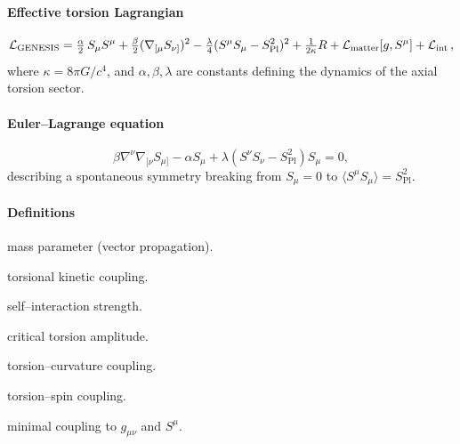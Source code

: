 \documentclass{article}
\newcommand{\Splanck}{S_{\mathrm{Pl}}}
\begin{document}
\paragraph{Effective torsion Lagrangian}
\begin{equation}\label{eq:full-lagrangian}
  \mathcal L_{\rm GENESIS}
    = \tfrac{\alpha}{2}\,S_\mu S^\mu
    + \tfrac{\beta}{2} (\nabla_{[\mu} S_{\nu]})^2
    - \tfrac{\lambda}{4}(S^\mu S_\mu - \Splanck^2)^2
    + \tfrac1{2\kappa}R
    + \mathcal L_{\rm matter}[g,S^\mu]
    + \mathcal L_{\rm int}\,,
\end{equation}
where \(\kappa=8\pi G/c^4\), and \(\alpha, \beta, \lambda\) are constants defining the dynamics of the axial torsion sector.

\paragraph{Euler--Lagrange equation}
\begin{equation}\label{eq:torsion-EOM}
  \beta \nabla^\nu \nabla_{[\nu} S_{\mu]} - \alpha S_\mu + \lambda (S^\nu S_\nu - \Splanck^2) S_\mu = 0,
\end{equation}
describing a spontaneous symmetry breaking from \(S_\mu = 0\) to \(\langle S^\mu S_\mu \rangle = \Splanck^2\).

\paragraph{Definitions}
\begin{description}[leftmargin=2em]
  \item[$\alpha$] mass parameter (vector propagation).
  \item[$\beta$] torsional kinetic coupling.
  \item[$\lambda$] self–interaction strength.
  \item[$\Splanck$] critical torsion amplitude.
  \item[$\xi$] torsion–curvature coupling.
  \item[$\eta$] torsion–spin coupling.
\item[\mbox{$\mathcal{L}_{\rm matter}[g, S^\mu]$}] minimal coupling to $g_{\mu\nu}$ and $S^\mu$.
 
\end{description}
\end{document}
